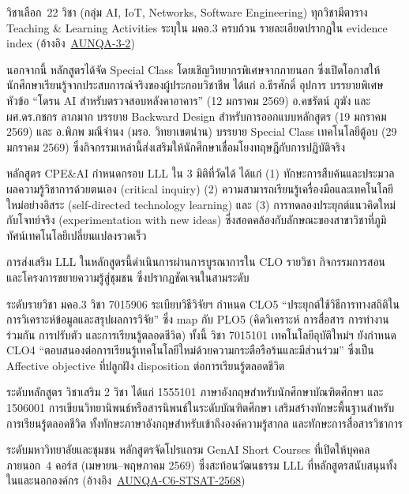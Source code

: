 วิชาเลือก~22 วิชา (กลุ่ม AI, IoT, Networks, Software Engineering) ทุกวิชามีตาราง Teaching \& Learning Activities ระบุใน มคอ.3 ครบถ้วน รายละเอียดปรากฏใน evidence index (อ้างอิง~\hyperlink{ref:AUNQA-3-2}{AUNQA-3-2})

นอกจากนี้ หลักสูตรได้จัด Special Class โดยเชิญวิทยากรพิเศษจากภายนอก ซึ่งเปิดโอกาสให้นักศึกษาเรียนรู้จากประสบการณ์จริงของผู้ประกอบวิชาชีพ ได้แก่ อ.ธีรศักดิ์ อุปการ บรรยายพิเศษหัวข้อ ``โดรน AI สำหรับตรวจสอบหลังคาอาคาร'' (12 มกราคม 2569) อ.คชรัตน์ ภูฆัง และ ผศ.ดร.กชกร ลาภมาก บรรยาย Backward Design สำหรับการออกแบบหลักสูตร (19 มกราคม 2569) และ อ.พิภพ มณีจำนง (มรอ. วิทยาเขตน่าน) บรรยาย Special Class เทคโนโลยีตู้อบ (29 มกราคม 2569) ซึ่งกิจกรรมเหล่านี้ส่งเสริมให้นักศึกษาเชื่อมโยงทฤษฎีกับการปฏิบัติจริง


หลักสูตร CPE\&AI กำหนดกรอบ LLL ใน 3 มิติที่วัดได้ ได้แก่ (1) ทักษะการสืบค้นและประมวลผลความรู้วิชาการด้วยตนเอง (critical inquiry) (2) ความสามารถเรียนรู้เครื่องมือและเทคโนโลยีใหม่อย่างอิสระ (self-directed technology learning) และ (3) การทดลองประยุกต์แนวคิดใหม่กับโจทย์จริง (experimentation with new ideas) ซึ่งสอดคล้องกับลักษณะของสาขาวิชาที่ภูมิทัศน์เทคโนโลยีเปลี่ยนแปลงรวดเร็ว

การส่งเสริม LLL ในหลักสูตรนี้ดำเนินการผ่านการบูรณาการใน CLO รายวิชา กิจกรรมการสอน และโครงการขยายความรู้สู่ชุมชน ซึ่งปรากฏชัดเจนในสามระดับ

ระดับรายวิชา มคอ.3 วิชา 7015906 ระเบียบวิธีวิจัยฯ กำหนด CLO5 ``ประยุกต์ใช้วิธีการทางสถิติในการวิเคราะห์ข้อมูลและสรุปผลการวิจัย'' ซึ่ง map กับ PLO5 (คิดวิเคราะห์ การสื่อสาร การทำงานร่วมกัน การปรับตัว และการเรียนรู้ตลอดชีวิต) ทั้งนี้ วิชา 7015101 เทคโนโลยีอุบัติใหม่ฯ ยังกำหนด CLO4 ``ตอบสนองต่อการเรียนรู้เทคโนโลยีใหม่ด้วยความกระตือรือร้นและมีส่วนร่วม'' ซึ่งเป็น Affective objective ที่ปลูกฝัง disposition ต่อการเรียนรู้ตลอดชีวิต

ระดับหลักสูตร วิชาเสริม 2 วิชา ได้แก่ 1555101 ภาษาอังกฤษสำหรับนักศึกษาบัณฑิตศึกษา และ 1506001 การเขียนวิทยานิพนธ์หรือสารนิพนธ์ในระดับบัณฑิตศึกษา เสริมสร้างทักษะพื้นฐานสำหรับการเรียนรู้ตลอดชีวิต ทั้งทักษะภาษาอังกฤษสำหรับเข้าถึงองค์ความรู้สากล และทักษะการสื่อสารวิชาการ

ระดับมหาวิทยาลัยและชุมชน หลักสูตรจัดโปรแกรม GenAI Short Courses ที่เปิดให้บุคคลภายนอก~4 คอร์ส (เมษายน--พฤษภาคม 2569) ซึ่งสะท้อนวัฒนธรรม LLL ที่หลักสูตรสนับสนุนทั้งในและนอกองค์กร (อ้างอิง~\hyperlink{ref:AUNQA-C6-STSAT-2568}{AUNQA-C6-STSAT-2568})

